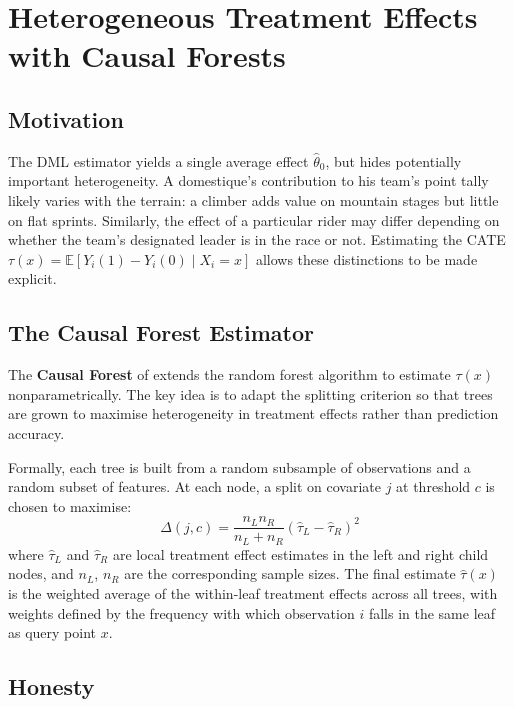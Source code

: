 \section{Heterogeneous Treatment Effects with Causal Forests}

\subsection{Motivation}

The DML estimator yields a single average effect $\hat{\theta}_0$, but hides potentially important heterogeneity. A domestique's contribution to his team's point tally likely varies with the terrain: a climber adds value on mountain stages but little on flat sprints. Similarly, the effect of a particular rider may differ depending on whether the team's designated leader is in the race or not. Estimating the CATE $\tau(x) = \mathbb{E}[Y_i(1) - Y_i(0) \mid X_i = x]$ allows these distinctions to be made explicit.

\subsection{The Causal Forest Estimator}

The \textbf{Causal Forest} of \citet{wager2018} extends the random forest algorithm to estimate $\tau(x)$ nonparametrically. The key idea is to adapt the splitting criterion so that trees are grown to maximise heterogeneity in treatment effects rather than prediction accuracy.

Formally, each tree is built from a random subsample of observations and a random subset of features. At each node, a split on covariate $j$ at threshold $c$ is chosen to maximise:
\begin{equation}
    \Delta(j, c) = \frac{n_L n_R}{n_L + n_R} \left(\hat{\tau}_L - \hat{\tau}_R\right)^2
    \label{eq:splitting}
\end{equation}
where $\hat{\tau}_L$ and $\hat{\tau}_R$ are local treatment effect estimates in the left and right child nodes, and $n_L$, $n_R$ are the corresponding sample sizes. The final estimate $\hat{\tau}(x)$ is the weighted average of the within-leaf treatment effects across all trees, with weights defined by the frequency with which observation $i$ falls in the same leaf as query point $x$.

\subsection{Honesty}

